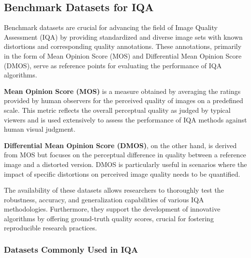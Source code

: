 \subsection{Benchmark Datasets for IQA}
\label{sub:BenchmarkDatasetsIQA}
Benchmark datasets are crucial for advancing the field of Image Quality Assessment (IQA) by providing standardized and diverse image sets with known distortions and corresponding quality annotations. These annotations, primarily in the form of Mean Opinion Score (MOS) and Differential Mean Opinion Score (DMOS), serve as reference points for evaluating the performance of IQA algorithms. \par
\vspace{\baselineskip}
\textbf{Mean Opinion Score (MOS)} is a measure obtained by averaging the ratings provided by human observers for the perceived quality of images on a predefined scale. This metric reflects the overall perceptual quality as judged by typical viewers and is used extensively to assess the performance of IQA methods against human visual judgment. \par
\vspace{\baselineskip}
\textbf{Differential Mean Opinion Score (DMOS)}, on the other hand, is derived from MOS but focuses on the perceptual difference in quality between a reference image and a distorted version. DMOS is particularly useful in scenarios where the impact of specific distortions on perceived image quality needs to be quantified. \par
\vspace{\baselineskip}
The availability of these datasets allows researchers to thoroughly test the robustness, accuracy, and generalization capabilities of various IQA methodologies. Furthermore, they support the development of innovative algorithms by offering ground-truth quality scores, crucial for fostering reproducible research practices. \par

\subsubsection{Datasets Commonly Used in IQA}
\label{subsub:DatasetsIQA}

